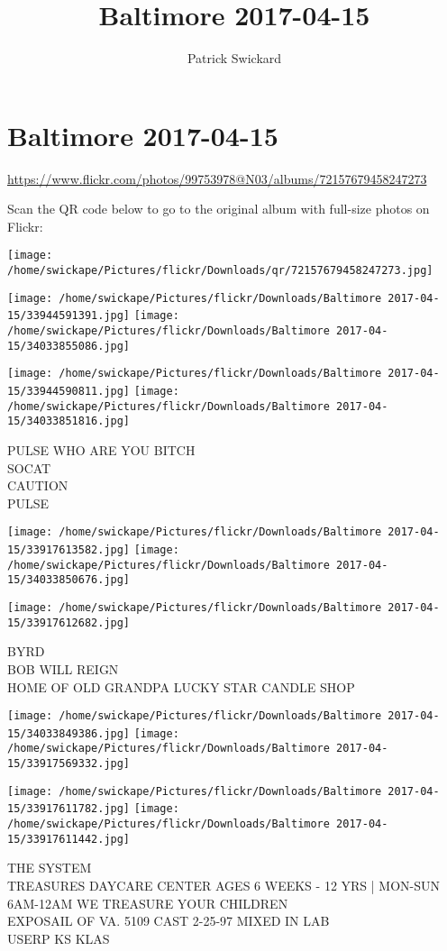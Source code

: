 \documentclass[10pt,letterpaper]{article}
\title{Baltimore 2017-04-15}
\author{Patrick Swickard}
\date{}
\begin{document}
\section*{Baltimore 2017-04-15}

\url{https://www.flickr.com/photos/99753978@N03/albums/72157679458247273}

Scan the QR code below to go to the original album with full-size photos on Flickr:

\texttt{[image: /home/swickape/Pictures/flickr/Downloads/qr/72157679458247273.jpg]}
\pagebreak

\texttt{[image: /home/swickape/Pictures/flickr/Downloads/Baltimore 2017-04-15/33944591391.jpg]}
\texttt{[image: /home/swickape/Pictures/flickr/Downloads/Baltimore 2017-04-15/34033855086.jpg]}

\texttt{[image: /home/swickape/Pictures/flickr/Downloads/Baltimore 2017-04-15/33944590811.jpg]}
\texttt{[image: /home/swickape/Pictures/flickr/Downloads/Baltimore 2017-04-15/34033851816.jpg]}

PULSE WHO ARE YOU BITCH\\
SOCAT\\
CAUTION\\
PULSE
\pagebreak

\texttt{[image: /home/swickape/Pictures/flickr/Downloads/Baltimore 2017-04-15/33917613582.jpg]}
\texttt{[image: /home/swickape/Pictures/flickr/Downloads/Baltimore 2017-04-15/34033850676.jpg]}

\vspace{0.25in}
\texttt{[image: /home/swickape/Pictures/flickr/Downloads/Baltimore 2017-04-15/33917612682.jpg]}

BYRD\\
BOB WILL REIGN\\
HOME OF OLD GRANDPA LUCKY STAR CANDLE SHOP
\pagebreak

\texttt{[image: /home/swickape/Pictures/flickr/Downloads/Baltimore 2017-04-15/34033849386.jpg]}
\texttt{[image: /home/swickape/Pictures/flickr/Downloads/Baltimore 2017-04-15/33917569332.jpg]}

\texttt{[image: /home/swickape/Pictures/flickr/Downloads/Baltimore 2017-04-15/33917611782.jpg]}
\texttt{[image: /home/swickape/Pictures/flickr/Downloads/Baltimore 2017-04-15/33917611442.jpg]}

THE SYSTEM\\
TREASURES DAYCARE CENTER AGES 6 WEEKS {-} 12 YRS | MON{-}SUN 6AM{-}12AM WE TREASURE YOUR CHILDREN\\
EXPOSAIL OF VA. 5109 CAST 2{-}25{-}97 MIXED IN LAB\\
USERP KS KLAS
\pagebreak
\end{document}
